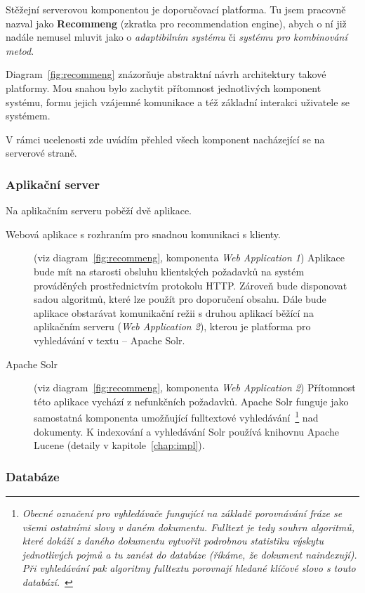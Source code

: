\documentclass[thesis=M,czech]{FITthesis}[2014/05/07]
\begin{document}
Stěžejní serverovou komponentou je doporučovací platforma. Tu jsem pracovně nazval jako \textbf{Recommeng} (zkratka pro recommendation engine), abych o ní již nadále nemusel mluvit jako o \emph{adaptibilním systému} či \emph{systému pro kombinování metod}. 

Diagram~\ref{fig:recommeng} znázorňuje abstraktní návrh architektury takové platformy. Mou snahou bylo zachytit přítomnost jednotlivých komponent systému, formu jejich vzájemné komunikace a též základní interakci uživatele se systémem.

V rámci ucelenosti zde uvádím přehled všech komponent nacházející se na serverové straně.

\subsubsection{Aplikační server}

Na aplikačním serveru poběží dvě aplikace. 

\begin{description}
	\item[Webová aplikace s rozhraním pro snadnou komunikaci s klienty.]
	(viz diagram~\ref{fig:recommeng}, komponenta \emph{Web Application 1}) Aplikace bude mít na starosti obsluhu klientských požadavků na systém prováděných prostřednictvím protokolu HTTP. Zároveň bude disponovat sadou algoritmů, které lze použít pro doporučení obsahu. Dále bude aplikace obstarávat komunikační režii s druhou aplikací běžící na aplikačním serveru (\emph{Web Application 2}), kterou je platforma pro vyhledávání v textu – Apache Solr.

	\item[Apache Solr]
	(viz diagram~\ref{fig:recommeng}, komponenta \emph{Web Application 2}) Přítomnost této aplikace vychází z nefunkčních požadavků. Apache Solr funguje jako samostatná komponenta umožňující fulltextové vyhledávání~\footnote{\emph{Obecné označení pro vyhledávače fungující na základě porovnávání fráze se všemi ostatními slovy v daném dokumentu. Fulltext je tedy souhrn algoritmů, které dokáží z daného dokumentu vytvořit podrobnou statistiku výskytu jednotlivých pojmů a tu zanést do databáze (říkáme, že dokument naindexují). Při vyhledávání pak algoritmy fulltextu porovnají hledané klíčové slovo s touto databází.}~\cite{fulltext}} nad dokumenty. K indexování a vyhledávání Solr používá knihovnu Apache Lucene (detaily v kapitole~\ref{chap:impl}).
\end{description}

\subsubsection{Databáze}
\end{document}
